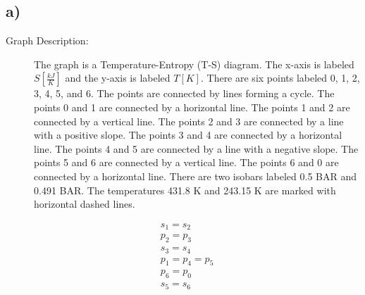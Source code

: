 

\subsection*{a)}

\begin{description}
    \item[Graph Description:] The graph is a Temperature-Entropy (T-S) diagram. The x-axis is labeled $S \left[ \frac{kJ}{K} \right]$ and the y-axis is labeled $T \left[ K \right]$. There are six points labeled 0, 1, 2, 3, 4, 5, and 6. The points are connected by lines forming a cycle. The points 0 and 1 are connected by a horizontal line. The points 1 and 2 are connected by a vertical line. The points 2 and 3 are connected by a line with a positive slope. The points 3 and 4 are connected by a horizontal line. The points 4 and 5 are connected by a line with a negative slope. The points 5 and 6 are connected by a vertical line. The points 6 and 0 are connected by a horizontal line. There are two isobars labeled 0.5 BAR and 0.491 BAR. The temperatures 431.8 K and 243.15 K are marked with horizontal dashed lines.
\end{description}

\[
\begin{aligned}
    &s_1 = s_2 \\
    &p_2 = p_3 \\
    &s_3 = s_4 \\
    &p_1 = p_4 = p_5 \\
    &p_6 = p_0 \\
    &s_5 = s_6
\end{aligned}
\]